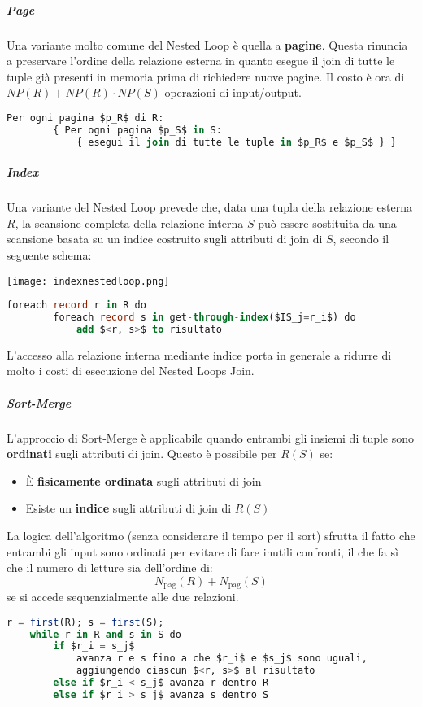 \subparagraph{Page}
Una variante molto comune del Nested Loop è quella a \textbf{pagine}. Questa rinuncia a preservare l'ordine della relazione esterna in quanto esegue il join di tutte le tuple già presenti in memoria prima di richiedere nuove pagine. Il costo è ora di $NP(R)+NP(R) \cdot NP(S)$ operazioni di input/output.
\begin{lstlisting}[language=SQL, mathescape]
	Per ogni pagina $p_R$ di R:
		{ Per ogni pagina $p_S$ in S:
			{ esegui il join di tutte le tuple in $p_R$ e $p_S$ } }
\end{lstlisting}
\subparagraph{Index}
Una variante del Nested Loop prevede che, data una tupla della relazione esterna $R$, la scansione completa della relazione interna $S$ può essere sostituita da una scansione basata su un indice costruito sugli attributi di join di $S$, secondo il seguente schema:
\begin{center}
	\texttt{[image: indexnestedloop.png]}
\end{center}
\begin{lstlisting}[language=SQL, mathescape]
	foreach record r in R do
		foreach record s in get-through-index($IS_j=r_i$) do
			add $<r, s>$ to risultato
\end{lstlisting}
L’accesso alla relazione interna mediante indice porta in generale a ridurre di molto i costi di esecuzione del Nested Loops Join.
\subparagraph{Sort-Merge}
L'approccio di Sort-Merge è applicabile quando entrambi gli insiemi di tuple sono \textbf{ordinati} sugli attributi di join. Questo è possibile per $R(S)$ se:
\begin{itemize}
	\item È \textbf{fisicamente ordinata} sugli attributi di join
	\item Esiste un \textbf{indice} sugli attributi di join di $R(S)$
\end{itemize}
La logica dell’algoritmo (senza considerare il tempo per il sort) sfrutta il fatto che entrambi gli input sono ordinati per evitare di fare inutili confronti, il che fa sì che il numero di letture sia dell’ordine di:
\begin{equation*}
	N_{\text{pag}}(R) + N_{\text{pag}}(S)
\end{equation*}
se si accede sequenzialmente alle due relazioni.

\begin{lstlisting}[language=SQL, mathescape]
	r = first(R); s = first(S);
	while r in R and s in S do
		if $r_i = s_j$
			avanza r e s fino a che $r_i$ e $s_j$ sono uguali,
			aggiungendo ciascun $<r, s>$ al risultato
		else if $r_i < s_j$ avanza r dentro R
		else if $r_i > s_j$ avanza s dentro S
\end{lstlisting}

